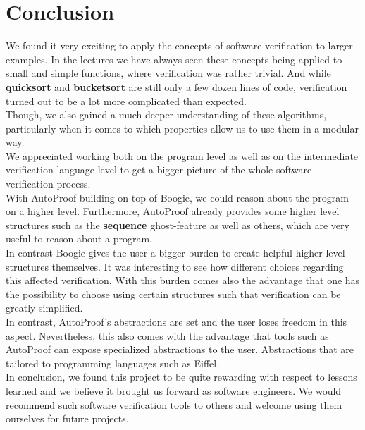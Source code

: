 \documentclass{report}
\begin{document}
\section{Conclusion}
\label{s:conclusion}
We found it very exciting to apply the concepts of software verification to larger examples.
In the lectures we have always seen these concepts being applied to small and simple functions,
where verification was rather trivial.
And while \textbf{quicksort} and \textbf{bucketsort} are still only a few dozen lines of code,
verification turned out to be a lot more complicated than expected.\\
Though, we also gained a much deeper understanding of these algorithms, particularly
when it comes to which properties allow us to use them in a modular way.\\
We appreciated working both on the program level as well as on the intermediate
verification language level to get a bigger picture of the whole software verification process.\\
With AutoProof building on top of Boogie, we could reason about the program on a higher level.
Furthermore, AutoProof already provides some higher level structures such as the \textbf{sequence} ghost-feature as well as others,
which are very useful to reason about a program.\\
In contrast Boogie gives the user a bigger burden to create helpful higher-level
structures themselves. It was interesting to see how different choices regarding this
affected verification. With this burden comes also the advantage that
one has the possibility to choose using certain structures such that verification
can be greatly simplified.\\
In contrast, AutoProof's abstractions are set and the user loses freedom in this aspect.
Nevertheless, this also comes with the advantage that tools such as AutoProof can
expose specialized abstractions to the user. Abstractions that are tailored to
programming languages such as Eiffel.\\
In conclusion, we found this project to be quite rewarding with respect to lessons
learned and we believe it brought us forward as software engineers. We would
recommend such software verification tools to others and welcome using them ourselves for future projects.



\end{document}

